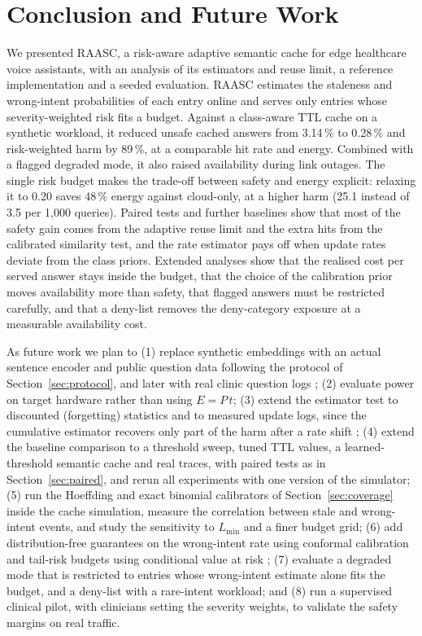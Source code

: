 \documentclass[journal]{IEEEtran}
\newcommand{\pct}{\,\%}
\begin{document}
\section{Conclusion and Future Work}\label{sec:conclusion}
We presented RAASC, a risk-aware adaptive semantic cache for edge healthcare voice assistants, with an analysis of its estimators and reuse limit, a reference implementation and a seeded evaluation. RAASC estimates the staleness and wrong-intent probabilities of each entry online and serves only entries whose severity-weighted risk fits a budget. Against a class-aware TTL cache on a synthetic workload, it reduced unsafe cached answers from 3.14\pct{} to 0.28\pct{} and risk-weighted harm by 89\pct{}, at a comparable hit rate and energy. Combined with a flagged degraded mode, it also raised availability during link outages. The single risk budget makes the trade-off between safety and energy explicit: relaxing it to 0.20 saves 48\pct{} energy against cloud-only, at a higher harm (25.1 instead of 3.5 per 1,000 queries). Paired tests and further baselines show that most of the safety gain comes from the adaptive reuse limit and the extra hits from the calibrated similarity test, and the rate estimator pays off when update rates deviate from the class priors. Extended analyses show that the realised cost per served answer stays inside the budget, that the choice of the calibration prior moves availability more than safety, that flagged answers must be restricted carefully, and that a deny-list removes the deny-category exposure at a measurable availability cost.

As future work we plan to (1) replace synthetic embeddings with an actual sentence encoder and public question data following the protocol of Section~\ref{sec:protocol}, and later with real clinic question logs \cite{reimers2019}; (2) evaluate power on target hardware rather than using $E=P\,t$; (3) extend the estimator test to discounted (forgetting) statistics and to measured update logs, since the cumulative estimator recovers only part of the harm after a rate shift \cite{gama2014}; (4) extend the baseline comparison to a threshold sweep, tuned TTL values, a learned-threshold semantic cache \cite{schroeder2026} and real traces, with paired tests as in Section~\ref{sec:paired}, and rerun all experiments with one version of the simulator; (5) run the Hoeffding and exact binomial calibrators of Section~\ref{sec:coverage} inside the cache simulation, measure the correlation between stale and wrong-intent events, and study the sensitivity to $L_{\min}$ and a finer budget grid; (6) add distribution-free guarantees on the wrong-intent rate using conformal calibration \cite{angelopoulos2021} and tail-risk budgets using conditional value at risk \cite{rockafellar2000}; (7) evaluate a degraded mode that is restricted to entries whose wrong-intent estimate alone fits the budget, and a deny-list with a rare-intent workload; and (8) run a supervised clinical pilot, with clinicians setting the severity weights, to validate the safety margins on real traffic.
\end{document}
